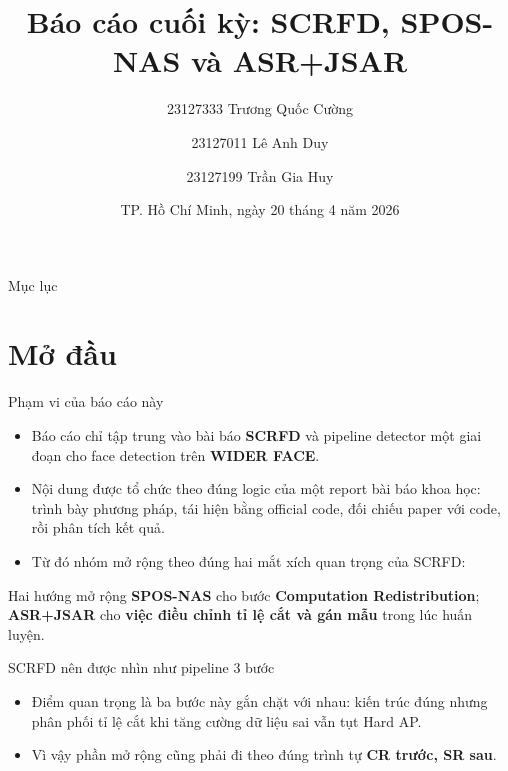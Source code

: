 \documentclass[aspectratio=169,11pt]{beamer}
\title[SCRFD Final]{Báo cáo cuối kỳ: SCRFD, SPOS-NAS và ASR+JSAR}
\author[Nhóm 23KHMT]{23127333 Trương Quốc Cường \and 23127011 Lê Anh Duy \and 23127199 Trần Gia Huy}
\institute[HCMUS]{CSC14006 -- Nhận dạng\\Trường ĐH Khoa học Tự nhiên, ĐHQG-HCM}
\date[20/04/2026]{TP. Hồ Chí Minh, ngày 20 tháng 4 năm 2026}
\begin{document}
\begin{frame}
  \titlepage
\end{frame}

\begin{frame}{Mục lục}
  \tableofcontents
\end{frame}

\section{Mở đầu}

\begin{frame}{Phạm vi của báo cáo này}
  \begin{itemize}
    \item Báo cáo chỉ tập trung vào bài báo \textbf{SCRFD} và pipeline detector một giai đoạn cho face detection trên \textbf{WIDER FACE}.
    \item Nội dung được tổ chức theo đúng logic của một report bài báo khoa học: trình bày phương pháp, tái hiện bằng official code, đối chiếu paper với code, rồi phân tích kết quả.
    \item Từ đó nhóm mở rộng theo đúng hai mắt xích quan trọng của SCRFD:
  \end{itemize}
  \begin{block}{Hai hướng mở rộng}
    \textbf{SPOS-NAS} cho bước \textbf{Computation Redistribution};\\[0.15cm]
    \textbf{ASR+JSAR} cho \textbf{việc điều chỉnh tỉ lệ cắt và gán mẫu} trong lúc huấn luyện.
  \end{block}
\end{frame}

\begin{frame}{SCRFD nên được nhìn như pipeline 3 bước}
  \centering

  \vspace{0.6cm}
  \begin{itemize}
    \item Điểm quan trọng là ba bước này gắn chặt với nhau: kiến trúc đúng nhưng phân phối tỉ lệ cắt khi tăng cường dữ liệu sai vẫn tụt Hard AP.
    \item Vì vậy phần mở rộng cũng phải đi theo đúng trình tự \textbf{CR trước, SR sau}.
  \end{itemize}
\end{frame}
\end{document}
